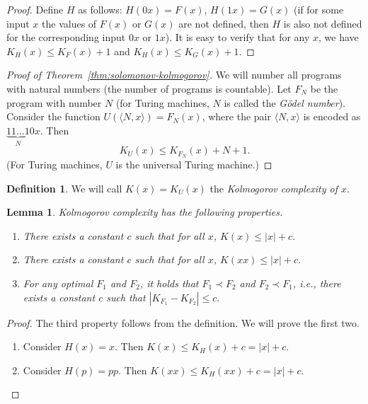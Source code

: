 \documentclass[12pt,sans]{article}
\theoremstyle{definition}
\newtheorem{definition}{Definition}[section]
\theoremstyle{plain}
\newtheorem{lemma}{Lemma}[section]
\theoremstyle{remark}
\begin{document}
\begin{proof}
    Define $H$ as follows: $H(0x) = F(x)$, $H(1x) = G(x)$ (if for some input $x$ the values of $F(x)$ or $G(x)$ are not defined, then $H$ is also not defined for the corresponding input $0x$ or $1x$). It is easy to verify that for any $x$, we have $K_H(x) \le K_F(x) + 1$ and $K_H(x) \le K_G(x) + 1$.
\end{proof}

\begin{proof}[Proof of Theorem~\ref{thm:solomonov-kolmogorov}]
    We will number all programs with natural numbers (the number of programs is countable). Let $F_N$ be the program with number $N$ (for Turing machines, $N$ is called the \emph{Gödel number}). Consider the function $U(\langle N, x\rangle) = F_N(x)$, where the pair $\langle N, x\rangle$ is encoded as $\underbrace{11\dots1}_{N}0x$. Then
    \[
    K_U(x) \le K_{F_N}(x) + N + 1.
    \]
    (For Turing machines, $U$ is the universal Turing machine.)
\end{proof}

\begin{definition}
    We will call $K(x) = K_U(x)$ the \emph{Kolmogorov complexity of $x$}.
\end{definition}

\begin{lemma} Kolmogorov complexity has the following properties.
    \begin{enumerate}
        \item There exists a constant $c$ such that for all $x$, $K(x) \le |x| + c$.
        \item There exists a constant $c$ such that for all $x$, $K(xx) \le |x| + c$.
        \item For any optimal $F_1$ and $F_2$, it holds that $F_1 \prec F_2$ and $F_2 \prec F_1$, i.e., there exists a constant $c$ such that
        \(
        |K_{F_1} - K_{F_2}| \le c.
        \)
    \end{enumerate}
\end{lemma}

\begin{proof} The third property follows from the definition. We will prove the first two.
    \begin{enumerate}
        \item Consider $H(x) = x$. Then
        \(K(x) \le K_H(x) + c = |x| + c\).
        \item Consider $H(p) = pp$. Then
        \(K(xx) \le K_H(xx) + c = |x| + c\).    \qedhere
    \end{enumerate}
\end{proof}
\end{document}
